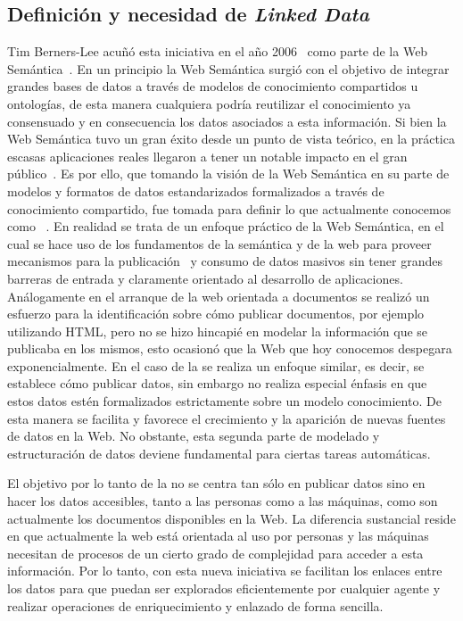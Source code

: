 \subsection{Definición y necesidad de \textit{Linked Data}}\label{def-linkeddata}
Tim Berners-Lee acuñó esta iniciativa en el año 2006~\cite{Berners-Lee-2006} como parte de la Web Semántica~\cite{Berners-Lee2001,WeavingTim,berners-lee06a}. 
En un principio la Web Semántica surgió con el objetivo de integrar grandes bases de datos a través de modelos de conocimiento compartidos u ontologías, de esta manera
cualquiera podría reutilizar el conocimiento ya consensuado y en consecuencia los datos asociados a esta información. Si bien
la Web Semántica tuvo un gran éxito desde un punto de vista teórico, en la práctica escasas aplicaciones reales llegaron a tener
un notable impacto en el gran público~\cite{sw-use-cases}. Es por ello, que tomando la visión de la Web Semántica en su parte de modelos y formatos de datos
estandarizados formalizados a través de conocimiento compartido, fue tomada para definir lo que actualmente conocemos como \linkeddata~\cite{linked-data}.
En realidad se trata de un enfoque práctico de la Web Semántica, en el cual
se hace uso de los fundamentos de la semántica y de la web para proveer mecanismos para la publicación~\cite{bizer07how,Berr08} y 
consumo de datos masivos sin tener grandes barreras de entrada y claramente orientado al desarrollo de aplicaciones. 
Análogamente en el arranque de la web orientada a documentos se realizó un esfuerzo para la identificación sobre cómo publicar documentos, por ejemplo utilizando HTML, pero no se hizo hincapié en
modelar la información que se publicaba en los mismos, esto ocasionó que la Web que hoy conocemos despegara exponencialmente. En el caso
de la \wod se realiza un enfoque similar, es decir, se establece cómo publicar datos, sin embargo no realiza especial énfasis
 en que estos datos estén formalizados estrictamente sobre un modelo conocimiento. De esta manera se facilita y favorece el crecimiento y la aparición de nuevas fuentes
de datos en la Web. No obstante, esta segunda parte de modelado y estructuración de datos deviene fundamental para ciertas tareas
automáticas.

El objetivo por lo tanto de la \wod no se centra tan sólo en publicar datos sino en hacer los datos accesibles, tanto a las personas
como a las máquinas, como son actualmente los documentos disponibles en la Web. La diferencia sustancial reside en que actualmente
la web está orientada al uso por personas y las máquinas necesitan de procesos de un cierto grado de complejidad para acceder a esta información.
Por lo tanto, con esta nueva iniciativa se facilitan los enlaces entre los datos para que puedan ser explorados eficientemente 
por cualquier agente y realizar operaciones de enriquecimiento y enlazado de forma sencilla.

